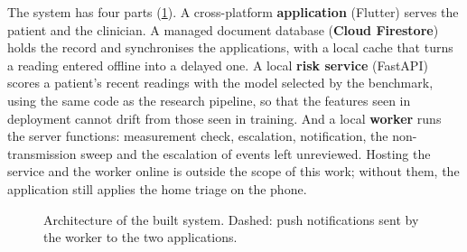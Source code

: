 \documentclass[11pt,a4paper,oneside]{report}
\begin{document}
The system has four parts (\cref{fig:architecture}). A cross-platform \textbf{application} (Flutter) serves the patient and the clinician. A managed document database (\textbf{Cloud Firestore}) holds the record and synchronises the applications, with a local cache that turns a reading entered offline into a delayed one. A local \textbf{risk service} (FastAPI) scores a patient's recent readings with the model selected by the benchmark, using the same code as the research pipeline, so that the features seen in deployment cannot drift from those seen in training. And a local \textbf{worker} runs the server functions: measurement check, escalation, notification, the non-transmission sweep and the escalation of events left unreviewed. Hosting the service and the worker online is outside the scope of this work; without them, the application still applies the home triage on the phone.

\begin{figure}[htbp]
\centering
{}
\caption{Architecture of the built system. Dashed: push notifications sent by the worker to the two applications.}\label{fig:architecture}
\end{figure}
\end{document}
